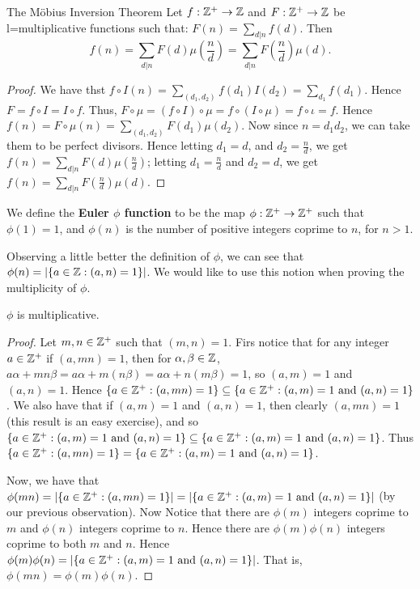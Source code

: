 \begin{namedtheorem}{The M\"obius Inversion Theorem}
    Let $f:\mathbb{Z}^+ \rightarrow \mathbb{Z}$ and $F: \mathbb{Z}^+ \rightarrow \mathbb{Z}$ be l=multiplicative functions such that: $F(n)=\sum_{d|n} f(d)$. Then
        \begin{equation}
            f(n)=\sum_{d|n} F(d)\mu(\frac{n}{d})=\sum_{d|n} F(\frac{n}{d})\mu(d).
        \end{equation}
\end{namedtheorem}
\begin{proof}
    We have thst $f \circ I(n)=\sum_{(d_1,d_2)}f(d_1)I(d_2)=\sum_{d_1}f(d_1)$. Hence $F=f \circ I=I \circ f$. Thus, $F \circ \mu=(f \circ I) \circ \mu=f \circ (I \circ \mu)=f \circ \iota=f$. Hence $f(n)=F \circ \mu(n)= \sum_{(d_1,d_2)} F(d_1)\mu(d_2)$. Now since $n=d_1d_2$, we can take them to be perfect divisors. Hence letting $d_1=d$, and $d_2=\frac{n}{d}$, we get $f(n)=\sum_{d|n} F(d)\mu(\frac{n}{d})$; letting $d_1=\frac{n}{d}$ and $d_2=d$, we get $f(n)=\sum_{d|n} F(\frac{n}{d})\mu(d)$.
\end{proof}

\begin{definition}
    We define the \textbf{Euler $\phi$ function} to be the map $\phi:\mathbb{Z}^+ \rightarrow \mathbb{Z}^+$ such that $\phi(1)=1$, and $\phi(n)$ is the number of positive integers coprime to $n$, for $n>1$.
\end{definition}

Observing a little better the definition of $\phi$, we can see that $\phi(n)=|\{a \in \mathbb{Z}:(a,n)=1\}|$. We would like to use this notion when proving the multiplicity of $\phi$.

\begin{lemma}\label{lemma2.2.15}
    $\phi$ is multiplicative.
\end{lemma}
\begin{proof}
    Let $m,n \in \mathbb{Z}^+$ such that $(m,n)=1$. Firs notice that for any integer $a \in \mathbb{Z}^+$ if $(a,mn)=1$, then for $\alpha,\beta \in \mathbb{Z}$, $a\alpha+mn\beta=a\alpha+m(n\beta)=a\alpha+n(m\beta)=1$, so $(a,m)=1$ and $(a,n)=1$. Hence $\{a \in \mathbb{Z}^+:(a,mn)=1\} \subseteq \{a \in \mathbb{Z}^+:(a,m)=1 \text{ and } (a,n)=1\}$. We also have that if $(a,m)=1$ and $(a,n)=1$, then clearly $(a,mn)=1$ (this result is an easy exercise), and so $\{a \in \mathbb{Z}^+:(a,m)=1 \text{ and } (a,n)=1\} \subseteq \{a \in \mathbb{Z}^+:(a,m)=1 \text{ and } (a,n)=1\}$. Thus $\{a \in \mathbb{Z}^+:(a,mn)=1\}=\{a \in \mathbb{Z}^+:(a,m)=1 \text{ and } (a,n)=1\}$.
    
    Now, we have that $\phi(mn)=|\{a \in \mathbb{Z}^+:(a,mn)=1\}|=|\{a \in \mathbb{Z}^+:(a,m)=1 \text{ and } (a,n)=1\}|$ (by our previous observation). Now Notice that there are $\phi(m)$ integers coprime to $m$ and $\phi(n)$ integers coprime to $n$. Hence there are $\phi(m)\phi(n)$ integers coprime to both $m$ and $n$. Hence $\phi(m)\phi(n)=|\{a \in \mathbb{Z}^+:(a,m)=1 \text{ and } (a,n)=1\}|$. That is, $\phi(mn)=\phi(m)\phi(n)$.
\end{proof}

